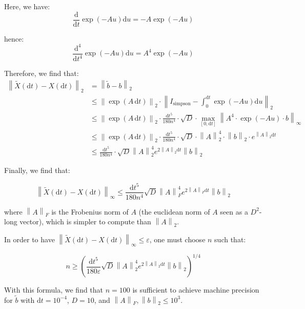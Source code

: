 \documentclass[a4paper]{article}
\newcommand{\dt}{\mathrm{d}t}
\newcommand{\normeuc}[1]{\left\| #1 \right\|_2}
\newcommand{\normF}[1]{\left\| #1 \right\|_F}
\newcommand{\norminf}[1]{\left\| #1 \right\|_\infty}
\newcommand{\eps}{\varepsilon}
\begin{document}
Here, we have:
\begin{equation}
\frac{\mathrm{d}}{\dt} \exp(-A u) \mathrm{d} u = -A \exp(-A u)
\end{equation}

hence:
\begin{equation}
\frac{\mathrm{d}^4}{\dt^4} \exp(-A u) \mathrm{d} u = A^4 \exp(-A u)
\end{equation}

Therefore, we find that:
\begin{align}
\normeuc{\widetilde X(\dt) - X(\dt)} &= \normeuc{\widetilde b-b}\\
&\leq \normeuc{\exp(A \, \dt)} \cdot \normeuc{I_{\textrm{simpson}} - \int_0^{\dt} \exp(-A u) \mathrm{d}u}\\
&\leq \normeuc{\exp(A \, \dt)} \cdot \frac{\dt^5}{180n^4} \cdot \sqrt{D} \cdot \max_{[0,\dt]} \norminf{A^4 \cdot \exp(-A u) \cdot b}\\
&\leq \normeuc{\exp(A \, \dt)} \cdot \frac{\dt^5}{180n^4} \cdot \sqrt{D} \cdot \normeuc{A}^4 \cdot \normeuc{b} \cdot e^{\normeuc{A}\dt}\\
&\leq \frac{\dt^5}{180n^4} \cdot \sqrt{D} \normeuc{A}^4 e^{2\normeuc{A}\dt} \normeuc{b}
\end{align}

Finally, we find that:

\begin{equation}
\norminf{\widetilde X(\dt) - X(\dt)} \leq \frac{\dt^5}{180n^4} \sqrt{D} \normF{A}^4 e^{2\normF{A}\dt} \normeuc{b}
\end{equation}

where $\normF{A}$ is the Frobenius norm of $A$ (the euclidean norm of $A$ seen as a $D^2$-long vector),
which is simpler to compute than $\normeuc{A}$.

In order to have $\norminf{\widetilde X(\dt) - X(\dt)} \leq \eps$, one must choose $n$ such that:

\begin{equation}
n \geq \left(\frac{\dt^5}{180 \eps} \sqrt{D} \normeuc{A}^4 e^{2\normeuc{A}\dt} \normeuc{b}\right)^{1/4}
\end{equation}

With this formula, we find that $n = 100$ is sufficient to achieve machine precision for $\widetilde b$ with
$\dt = 10^{-4}$, $D = 10$, and $\normF{A}, \normeuc{b} \leq 10^3$.
\end{document}

